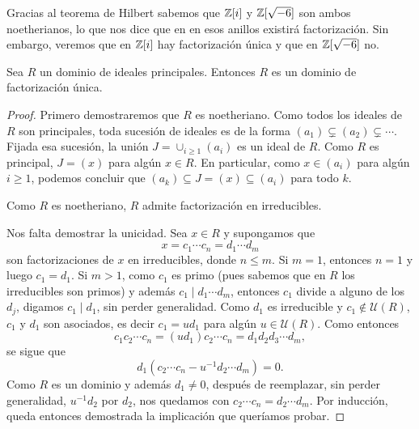 \begin{example}
Gracias al teorema de Hilbert sabemos que $\mathbb{Z}[i]$ y $\mathbb{Z}[\sqrt{-6}]$ son ambos noetherianos, lo que nos dice que 
en en esos anillos existirá factorización. Sin embargo, veremos que en $\mathbb{Z}[i]$ hay factorización única y que en $\mathbb{Z}[\sqrt{-6}]$ no. 
\end{example}

\begin{theorem}
Sea $R$ un dominio de ideales principales. 
Entonces $R$ es un dominio de factorización única.
\end{theorem}

\begin{proof}
Primero demostraremos que $R$ es noetheriano. Como todos los ideales de $R$ son principales, toda sucesión de ideales es
de la forma $(a_1)\subsetneq (a_2)\subsetneq\cdots$. Fijada esa sucesión, la unión 
$J=\cup_{i\geq 1}(a_i)$ es un ideal de $R$. Como $R$ es principal, $J=(x)$ para algún $x\in R$. 
En particular, como $x\in (a_i)$ para algún $i\geq1$, 
podemos concluir que $(a_k)\subseteq J=(x)\subseteq (a_i)$ para todo $k$. 

Como $R$ es noetheriano, $R$ admite 
factorización en irreducibles. 

Nos falta demostrar la unicidad. Sea $x\in R$ y supongamos que 
\[
x=c_1\cdots c_n=d_1\cdots d_m
\]
son factorizaciones de $x$ en irreducibles, donde $n\leq m$. 
Si $m=1$, entonces $n=1$ y luego $c_1=d_1$. Si $m>1$, como $c_1$ es primo (pues sabemos 
que en $R$ los irreducibles son primos) y además $c_1\mid d_1\cdots d_m$, 
entonces $c_1$ divide a alguno de los $d_j$, digamos $c_1\mid d_1$, sin perder generalidad. 
Como $d_1$ es irreducible y $c_1\not\in\mathcal{U}(R)$, 
$c_1$ y $d_1$ son asociados, es decir $c_1=ud_1$ para algún $u\in\mathcal{U}(R)$. Como entonces 
\[
c_1c_2\cdots c_n=(ud_1)c_2\cdots c_n=d_1d_2d_3\cdots d_m,
\]
se sigue que 
\[
d_1(c_2\cdots c_n-u^{-1}d_2\cdots d_m)=0.
\]
Como $R$ es un dominio y además $d_1\ne 0$, 
después de reemplazar, sin perder generalidad, $u^{-1}d_2$ por $d_2$, nos quedamos con $c_2\cdots c_n=d_2\cdots d_m$. Por inducción, queda entonces
demostrada la implicación que queríamos probar.
\end{proof}

